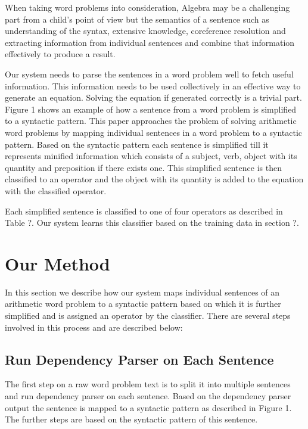 \documentclass[11pt]{article}
\begin{document}
When taking word problems into consideration, Algebra may be a challenging part from a child's point of view but the semantics of a sentence such as understanding of the syntax, extensive knowledge, coreference resolution and extracting information from individual sentences and combine that information effectively to produce a result.\newline

Our system needs to parse the sentences in a word problem well to fetch useful information. This information needs to be used collectively in an effective way to generate an equation. Solving the equation if generated correctly is a trivial part. Figure 1 shows an example of how a sentence from a word problem is simplified to a syntactic pattern. This paper approaches the problem of solving arithmetic word problems by mapping individual sentences in a word problem to a syntactic pattern. Based on the syntactic pattern each sentence is simplified till it represents minified information which consists of a subject, verb, object with its quantity and preposition if there exists one. This simplified sentence is then classified to an operator and the object with its quantity is added to the equation with the classified operator.\newline

Each simplified sentence is classified to one of four operators as described in Table ?. Our system learns this classifier based on the training data in section ?.

\section{Our Method}
\label{method}

In this section we describe how our system maps individual sentences of an arithmetic word problem to a syntactic pattern based on which it is further simplified and is assigned an operator by the classifier. There are several steps involved in this process and are described below:\newline

\subsection{Run Dependency Parser on Each Sentence}
The first step on a raw word problem text is to split it into multiple sentences and run dependency parser on each sentence. Based on the dependency parser output the sentence is mapped to a syntactic pattern as described in Figure 1. The further steps are based on the syntactic pattern of this sentence.
\end{document}
